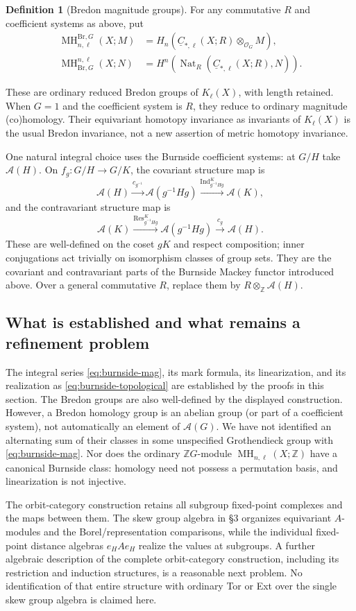 \documentclass[11pt,a4paper]{article}
\numberwithin{equation}{section}
\theoremstyle{definition}
\newtheorem{definition}[theorem]{Definition}
\theoremstyle{remark}
\newcommand{\Z}{\mathbb Z}
\newcommand{\G}{G}
\newcommand{\MH}{\operatorname{MH}}
\newcommand{\Res}{\operatorname{Res}}
\newcommand{\Ind}{\operatorname{Ind}}
\newcommand{\Nat}{\operatorname{Nat}}
\newcommand{\Br}{\mathrm{Br}}
\newcommand{\Burn}{\mathcal A}
\newcommand{\Orb}{\mathcal O}
\begin{document}
\begin{definition}[Bredon magnitude groups]
For any commutative $R$ and coefficient systems as above, put
\begin{align}
 \MH^{\Br,\G}_{n,\ell}(X;M)
   &=H_n(\underline C_{*,\ell}(X;R)\otimes_{\Orb_\G}M),\\
 \MH^{n,\ell}_{\Br,\G}(X;N)
   &=H^n(\Nat_R(\underline C_{*,\ell}(X;R),N)).
\end{align}
\end{definition}
These are ordinary reduced Bredon groups of $K_\ell(X)$, with
length retained.  When $\G=1$ and the coefficient system is $R$,
they reduce to ordinary magnitude (co)homology.  Their equivariant
homotopy invariance as invariants of $K_\ell(X)$ is the usual
Bredon invariance, not a new assertion of metric homotopy invariance.

One natural integral choice uses the Burnside coefficient systems:
at $\G/H$ take $\Burn(H)$.  On
$f_g:\G/H\to\G/K$, the covariant structure map is
\[
 \Burn(H)\xrightarrow{c_{g^{-1}}}\Burn(g^{-1}Hg)
       \xrightarrow{\Ind_{g^{-1}Hg}^{K}}\Burn(K),
\]
and the contravariant structure map is
\[
 \Burn(K)\xrightarrow{\Res_{g^{-1}Hg}^{K}}\Burn(g^{-1}Hg)
       \xrightarrow{c_g}\Burn(H).
\]
These are well-defined on the coset $gK$ and respect composition;
inner conjugations act trivially on isomorphism classes of group
sets.  They are the covariant and contravariant parts of the
Burnside Mackey functor introduced above.  Over a general commutative
$R$, replace them by $R\otimes_\Z\Burn(H)$.

\subsection*{\color{darkblue}What is established and what remains a refinement problem}
The integral series \eqref{eq:burnside-mag}, its mark formula, its
linearization, and its realization as \eqref{eq:burnside-topological}
are established by the proofs in this section.  The Bredon groups
are also well-defined by the displayed construction.  However, a
Bredon homology group is an abelian group (or part of a coefficient
system), not automatically an element of $\Burn(\G)$.  We have not
identified an alternating sum of their classes in some unspecified
Grothendieck group with \eqref{eq:burnside-mag}.  Nor does the
ordinary $\Z\G$-module $\MH_{n,\ell}(X;\Z)$ have a canonical
Burnside class: homology need not possess a permutation basis, and
linearization is not injective.

The orbit-category construction retains all subgroup fixed-point
complexes and the maps between them.  The skew group algebra in
\S3 organizes equivariant $A$-modules and the Borel/representation
comparisons, while the individual fixed-point distance algebras
$e_HAe_H$ realize the values at subgroups.  A further algebraic
description of the complete orbit-category construction, including
its restriction and induction structures, is a reasonable next
problem.  No identification of that entire structure with ordinary
Tor or Ext over the single skew group algebra is claimed here.
\end{document}
